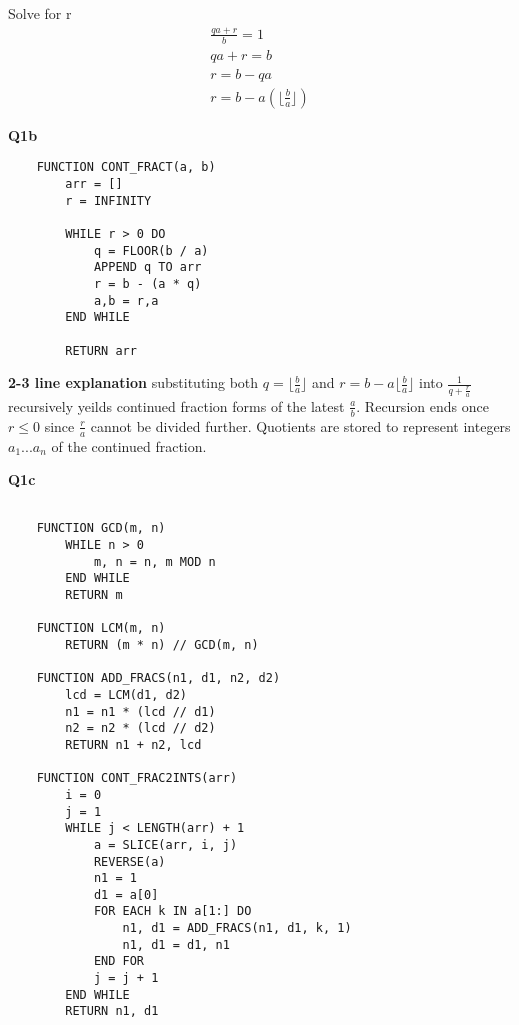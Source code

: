 \documentclass{article}
\begin{document}
Solve for r
\begin{align*}
    \frac{qa+r}{b} = 1 \\
    qa+r = b \\
    r = b-qa \\
    r = b -  a(\lfloor \frac{b}{a} \rfloor)
\end{align*}

\textbf{Q1b}

\begin{verbatim}
    FUNCTION CONT_FRACT(a, b)
        arr = []
        r = INFINITY
        
        WHILE r > 0 DO
            q = FLOOR(b / a)
            APPEND q TO arr
            r = b - (a * q)
            a,b = r,a
        END WHILE
        
        RETURN arr

\end{verbatim}

\textbf{2-3 line explanation} substituting both $q = \lfloor\frac{b}{a}\rfloor$ and 
$r=b-a\lfloor \frac{b}{a} \rfloor$ into $\frac{1}{q+\frac{r}{a}}$ recursively 
yeilds continued fraction forms of the latest $\frac{a}{b}$. Recursion ends 
once $r\leq0$ since  $\frac{r}{a}$ cannot be divided further.
Quotients are stored to represent integers $a_{1}...a_{n}$ of the continued fraction.




\textbf{Q1c}

\begin{verbatim}

    FUNCTION GCD(m, n)
        WHILE n > 0
            m, n = n, m MOD n
        END WHILE
        RETURN m

    FUNCTION LCM(m, n)
        RETURN (m * n) // GCD(m, n)

    FUNCTION ADD_FRACS(n1, d1, n2, d2)
        lcd = LCM(d1, d2)
        n1 = n1 * (lcd // d1)
        n2 = n2 * (lcd // d2)
        RETURN n1 + n2, lcd

    FUNCTION CONT_FRAC2INTS(arr)
        i = 0
        j = 1
        WHILE j < LENGTH(arr) + 1
            a = SLICE(arr, i, j)
            REVERSE(a)
            n1 = 1
            d1 = a[0]
            FOR EACH k IN a[1:] DO
                n1, d1 = ADD_FRACS(n1, d1, k, 1)
                n1, d1 = d1, n1
            END FOR
            j = j + 1
        END WHILE
        RETURN n1, d1

\end{verbatim}
\end{document}
